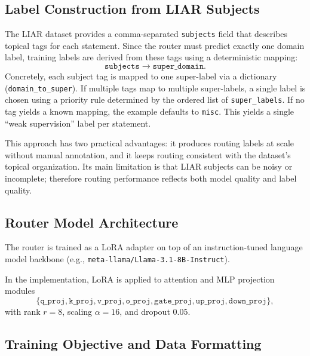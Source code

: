 \subsection{Label Construction from LIAR Subjects}

The LIAR dataset provides a comma-separated \texttt{subjects} field that describes topical tags for each statement. Since the router must predict exactly one domain label, training labels are derived from these tags using a deterministic mapping:
\[
\texttt{subjects} \rightarrow \texttt{super\_domain}.
\]
Concretely, each subject tag is mapped to one super-label via a dictionary (\texttt{domain\_to\_super}). If multiple tags map to multiple super-labels, a single label is chosen using a priority rule determined by the ordered list of \texttt{super\_labels}. If no tag yields a known mapping, the example defaults to \texttt{misc}. This yields a single ``weak supervision'' label per statement.

This approach has two practical advantages: it produces routing labels at scale without manual annotation, and it keeps routing consistent with the dataset's topical organization. Its main limitation is that LIAR subjects can be noisy or incomplete; therefore routing performance reflects both model quality and label quality.

\subsection{Router Model Architecture}

The router is trained as a LoRA adapter on top of an instruction-tuned language model backbone (e.g., \texttt{meta-llama/Llama-3.1-8B-Instruct}).

In the implementation, LoRA is applied to attention and MLP projection modules
\[
\{\texttt{q\_proj},\texttt{k\_proj},\texttt{v\_proj},\texttt{o\_proj},\texttt{gate\_proj},\texttt{up\_proj},\texttt{down\_proj}\},
\]
with rank $r=8$, scaling $\alpha=16$, and dropout $0.05$.

\subsection{Training Objective and Data Formatting}

